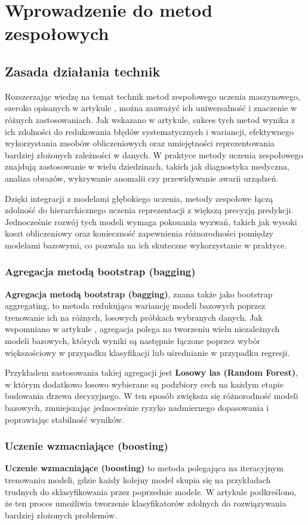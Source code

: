 \section{Wprowadzenie do metod zespołowych}

\subsection{Zasada działania technik}
Rozszerzając wiedzę na temat technik metod zespołowego uczenia
maszynowego, szeroko opisanych w artykule \cite{metoda8}, można
zauważyć ich uniwersalność i znaczenie w różnych zastosowaniach. Jak
wskazano w artykule, sukces tych metod wynika z ich zdolności do
redukowania błędów systematycznych i wariancji, efektywnego
wykorzystania zasobów obliczeniowych oraz umiejętności reprezentowania
bardziej złożonych zależności w danych. W praktyce metody uczenia zespołowego
znajdują zastosowanie w wielu dziedzinach, takich jak diagnostyka
medyczna, analiza obrazów, wykrywanie anomalii czy przewidywanie awarii
urządzeń.

Dzięki integracji z modelami głębokiego uczenia, metody zespołowe łączą
zdolność do hierarchicznego uczenia reprezentacji z większą precyzją
predykcji. Jednocześnie rozwój tych modeli wymaga pokonania wyzwań,
takich jak wysoki koszt obliczeniowy oraz konieczność zapewnienia
różnorodności pomiędzy modelami bazowymi, co pozwala na ich skuteczne
wykorzystanie w praktyce.

\subsubsection{Agregacja metodą bootstrap (bagging)}
\textbf{Agregacja metodą bootstrap (bagging)}, znana także jako bootstrap aggregating, to metoda
redukująca wariancję modeli bazowych poprzez trenowanie ich na różnych,
losowych próbkach wybranych danych. Jak wspomniano
w artykule \cite{Bagging}, agregacja polega na tworzeniu wielu niezależnych modeli
bazowych, których wyniki są następnie łączone poprzez wybór większościowy w przypadku klasyfikacji lub uśrednianie w przypadku
regresji.

Przykładem zastosowania takiej agregacji jest \textbf{Losowy las (Random Forest)}, w którym
dodatkowo losowo wybierane są podzbiory cech na każdym etapie budowania
drzewa decyzyjnego. W ten sposób zwiększa się różnorodność modeli
bazowych, zmniejszając jednocześnie ryzyko nadmiernego dopasowania i
poprawiając stabilność wyników.

\subsubsection{Uczenie wzmacniające (boosting)}
\textbf{Uczenie wzmacniające (boosting)} to metoda polegająca na iteracyjnym trenowaniu modeli, gdzie
każdy kolejny model skupia się na przykładach trudnych do
sklasyfikowania przez poprzednie modele. W artykule \cite{metoda8} podkreślono, że ten proces umożliwia tworzenie klasyfikatorów zdolnych do rozwiązywania bardziej złożonych problemów.

